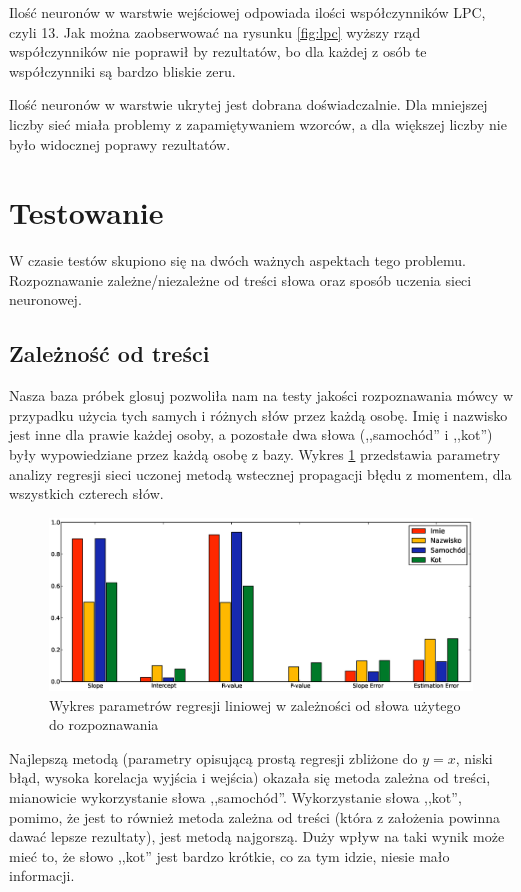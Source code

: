\documentclass[a4paper]{article}
\begin{document}
Ilość neuronów w warstwie wejściowej odpowiada ilości współczynników LPC, czyli
13. Jak można zaobserwować na rysunku \ref{fig:lpc} wyższy rząd współczynników
nie poprawił by rezultatów, bo dla każdej z osób te współczynniki są bardzo
bliskie zeru.

Ilość neuronów w warstwie ukrytej jest dobrana doświadczalnie. Dla mniejszej
liczby sieć miała problemy z zapamiętywaniem wzorców, a dla większej liczby nie
było widocznej poprawy rezultatów.

\section{Testowanie}

W czasie testów skupiono się na dwóch ważnych aspektach tego problemu.
Rozpoznawanie zależne/niezależne od treści słowa oraz sposób uczenia sieci
neuronowej.

\subsection{Zależność od treści}

Nasza baza próbek glosuj pozwoliła nam na testy jakości rozpoznawania mówcy w
przypadku użycia tych samych i różnych słów przez każdą osobę. Imię i nazwisko
jest inne dla prawie każdej osoby, a pozostałe dwa słowa (,,samochód'' i
,,kot'') były wypowiedziane przez każdą osobę z bazy. Wykres \ref{fig:word}
przedstawia parametry analizy regresji sieci uczonej metodą wstecznej
propagacji błędu z momentem, dla wszystkich czterech słów.

\begin{figure}[h!]
    \includegraphics[width=\textwidth]{word_network_reggresion}
    \caption{Wykres parametrów regresji liniowej w zależności od słowa użytego
    do rozpoznawania}
    \label{fig:word}
\end{figure}

Najlepszą metodą (parametry opisującą prostą regresji zbliżone do $y=x$, niski
błąd, wysoka korelacja wyjścia i wejścia) okazała się metoda zależna od treści,
mianowicie wykorzystanie słowa ,,samochód''. Wykorzystanie słowa ,,kot'',
pomimo, że jest to również metoda zależna od treści (która z założenia powinna
dawać lepsze rezultaty), jest metodą najgorszą. Duży wpływ na taki wynik może
mieć to, że słowo ,,kot'' jest bardzo krótkie, co za tym idzie, niesie mało
informacji.
\end{document}
